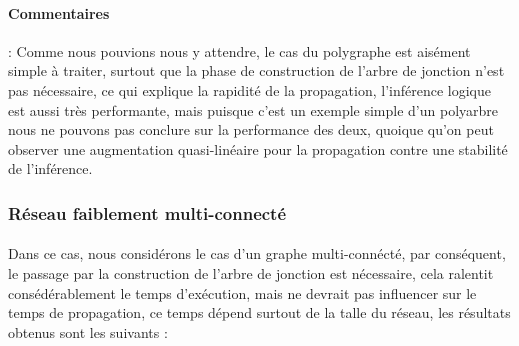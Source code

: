 \documentclass[]{report}
\begin{document}
    \paragraph{Commentaires}:
    Comme nous pouvions nous y attendre, le cas du polygraphe est aisément simple à traiter, surtout que la phase de construction de l'arbre de jonction n'est pas nécessaire, ce qui explique la rapidité de la propagation, l'inférence logique est aussi très performante, mais puisque c'est un exemple simple d'un polyarbre nous ne pouvons pas conclure sur la performance des deux, quoique qu'on peut observer une augmentation quasi-linéaire pour la propagation contre une stabilité de l'inférence.
	
	\subsubsection{Réseau faiblement multi-connecté}
	\paragraph{}
	Dans ce cas, nous considérons le cas d'un graphe multi-connécté, par conséquent, le passage par la construction de l'arbre de jonction
	est nécessaire, cela ralentit consédérablement le temps d'exécution, mais ne devrait pas influencer
	sur le temps de propagation, ce temps dépend surtout de la talle du réseau, les résultats obtenus sont les suivants :

	\begin{table}[H]
	\centering
	\end{table}
\end{document}
